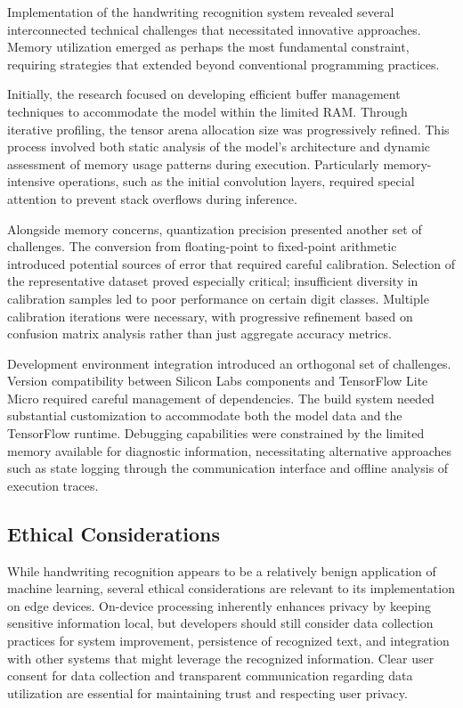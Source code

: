 \documentclass[
  9pt,
  letterpaper,
  abstract,
  titlepage]{scrbook}
\begin{document}
Implementation of the handwriting recognition system revealed several
interconnected technical challenges that necessitated innovative
approaches. Memory utilization emerged as perhaps the most fundamental
constraint, requiring strategies that extended beyond conventional
programming practices.

Initially, the research focused on developing efficient buffer
management techniques to accommodate the model within the limited RAM.
Through iterative profiling, the tensor arena allocation size was
progressively refined. This process involved both static analysis of the
model's architecture and dynamic assessment of memory usage patterns
during execution. Particularly memory-intensive operations, such as the
initial convolution layers, required special attention to prevent stack
overflows during inference.

Alongside memory concerns, quantization precision presented another set
of challenges. The conversion from floating-point to fixed-point
arithmetic introduced potential sources of error that required careful
calibration. Selection of the representative dataset proved especially
critical; insufficient diversity in calibration samples led to poor
performance on certain digit classes. Multiple calibration iterations
were necessary, with progressive refinement based on confusion matrix
analysis rather than just aggregate accuracy metrics.

Development environment integration introduced an orthogonal set of
challenges. Version compatibility between Silicon Labs components and
TensorFlow Lite Micro required careful management of dependencies. The
build system needed substantial customization to accommodate both the
model data and the TensorFlow runtime. Debugging capabilities were
constrained by the limited memory available for diagnostic information,
necessitating alternative approaches such as state logging through the
communication interface and offline analysis of execution traces.

\subsection{Ethical Considerations}\label{ethical-considerations}

While handwriting recognition appears to be a relatively benign
application of machine learning, several ethical considerations are
relevant to its implementation on edge devices. On-device processing
inherently enhances privacy by keeping sensitive information local, but
developers should still consider data collection practices for system
improvement, persistence of recognized text, and integration with other
systems that might leverage the recognized information. Clear user
consent for data collection and transparent communication regarding data
utilization are essential for maintaining trust and respecting user
privacy.
\end{document}
